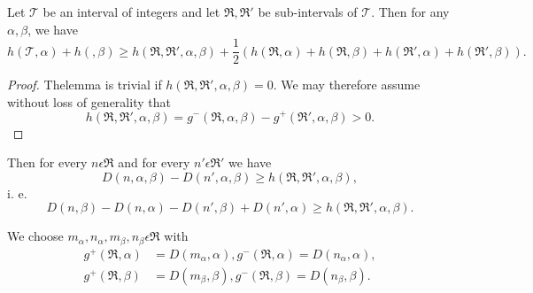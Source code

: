 \begin{lemma}\label{chap1:sec5:lem5C}
Let $\mathscr{T}$ be an interval of integers and let $\mathfrak{R}, \mathfrak{R}'$ be sub-intervals of $\mathscr{T}$. Then for any $\alpha, \beta$, we have
$$
h(\mathscr{T}, \alpha) + h(\mathscr, \beta) \geq h(\mathfrak{R}, \mathfrak{R}', \alpha, \beta) + \frac{1}{2} (h(\mathfrak{R}, \alpha) + h(\mathfrak{R}, \beta) + h(\mathfrak{R}', \alpha) + h(\mathfrak{R}', \beta)).
$$
\end{lemma}

\begin{proof}
        The\pageoriginale lemma is trivial if $h(\mathfrak{R}, \mathfrak{R}', \alpha, \beta) = 0$. We may therefore assume without loss of generality that
$$      
h(\mathfrak{R}, \mathfrak{R}', \alpha, \beta) = g^{-} (\mathfrak{R}, \alpha, \beta) - g^{+} (\mathfrak{R}', \alpha, \beta)> 0.
$$
\end{proof}

Then for every $n \epsilon \mathfrak{R}$ and for every $n' \epsilon \mathfrak{R}'$ we have
$$
D(n, \alpha, \beta) - D(n', \alpha, \beta) \geq h(\mathfrak{R}, \mathfrak{R}', \alpha, \beta),
$$
i. e.
\begin{equation*}
D(n, \beta) - D(n, \alpha) - D(n', \beta) + D(n', \alpha) \geq h(\mathfrak{R}, \mathfrak{R}', \alpha, \beta).\tag{5.2}\label{chap1:sec5:eq5.2}
\end{equation*}

We choose $m_{\alpha}, n_{\alpha}, m_{\beta}, n_{\beta} \epsilon \mathfrak{R}$ with
\begin{align*}
g^{+} (\mathfrak{R}, \alpha) & = D(m_{\alpha}, \alpha), g^{-} (\mathfrak{R}, \alpha) = D(n_{\alpha}, \alpha),\\
g^{+} (\mathfrak{R}, \beta) & = D(m_{\beta}, \beta), g^{-} (\mathfrak{R}, \beta) = D(n_{\beta}, \beta).
\end{align*}

